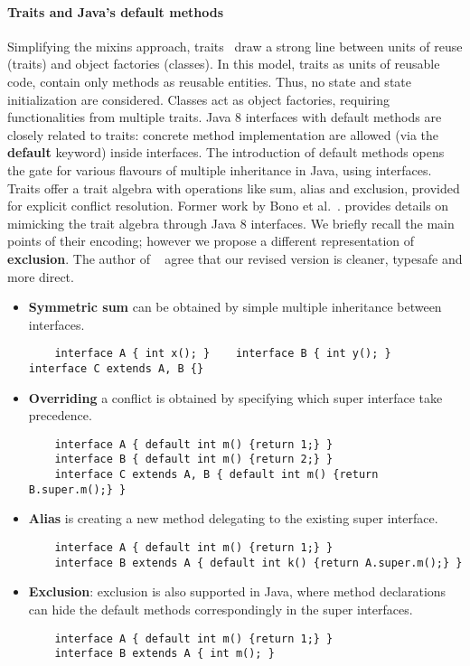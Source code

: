 \paragraph{Traits and Java's default methods}
Simplifying the mixins approach, traits~\cite{scharli03traits} draw a
strong line between units of reuse (traits) and object factories
(classes). In this model, traits as units of reusable code, contain
only methods as reusable entities. Thus, no state and state
initialization are considered. Classes act as object factories,
requiring functionalities from multiple traits. Java 8 interfaces with
default methods are closely related to traits: concrete method
implementation are allowed (via the \textbf{default} keyword) inside
interfaces. The introduction of default methods opens the gate for
various flavours of multiple inheritance in Java, using interfaces.
Traits offer a trait algebra with operations like sum, alias and exclusion, provided
for explicit conflict resolution.  
Former work by Bono et al.~\cite{bono14}. provides details on
mimicking the trait algebra through Java 8 interfaces. 
We briefly recall the main points of their encoding;
however we propose a different representation of \textbf{exclusion}.
The author of ~\cite{bono14} agree that our revised version is
cleaner, typesafe and more direct.

\newcommand\shortItem{\vspace{-1ex}}
\begin{itemize}
\item \textbf{Symmetric sum} can be obtained by simple multiple inheritance between interfaces.
\shortItem
    \begin{lstlisting}
    interface A { int x(); }    interface B { int y(); }    interface C extends A, B {}
    \end{lstlisting}
\shortItem
\item \textbf{Overriding} a conflict is obtained by specifying which super interface take precedence.
\shortItem
    \begin{lstlisting}
    interface A { default int m() {return 1;} } 
    interface B { default int m() {return 2;} }
    interface C extends A, B { default int m() {return B.super.m();} }
    \end{lstlisting}
\shortItem
\item \textbf{Alias} is creating  a new method delegating to the existing super interface.
\shortItem
    \begin{lstlisting}
    interface A { default int m() {return 1;} }
    interface B extends A { default int k() {return A.super.m();} }
    \end{lstlisting}
\shortItem

\item \textbf{Exclusion}: exclusion is also supported in Java, where method declarations can hide the default methods correspondingly in the super interfaces.
\shortItem
    \begin{lstlisting}
    interface A { default int m() {return 1;} }
    interface B extends A { int m(); }
    \end{lstlisting}
\shortItem
\end{itemize}

